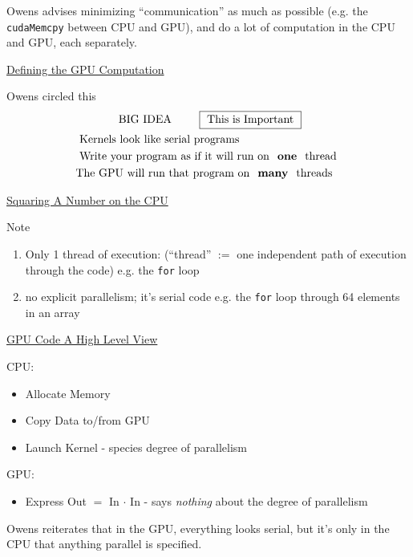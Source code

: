 \documentclass[10pt]{amsart}
\begin{document}
\begin{multicols*}{2}
Owens advises minimizing ``communication'' as much as possible (e.g. the \verb|cudaMemcpy| between CPU and GPU), and do a lot of computation in the CPU and GPU, each separately.

\href{https://classroom.udacity.com/courses/cs344/lessons/55120467/concepts/672300540923}{Defining the GPU Computation}

Owens circled this
{\Large
  \[
  \begin{gathered}
\text{ BIG IDEA } \qquad \, \boxed{ \text{ This is Important } }  \\
\begin{aligned} 
& \text{ Kernels look like serial programs } \\
  & \text{ Write your program as if it will run on \textbf{ one } thread } \\
  & \text{The GPU will run that program on \textbf{ many } threads}
  \end{aligned}
\end{gathered}
\]
}

\href{https://classroom.udacity.com/courses/cs344/lessons/55120467/concepts/670742840923}{Squaring A Number on the CPU}

Note
\begin{enumerate}
\item Only 1 thread of execution: (``thread'' $:=$ one independent path of execution through the code) e.g. the \verb|for| loop
  \item no explicit parallelism; it's serial code e.g. the \verb|for| loop through 64 elements in an array
  \end{enumerate}


\href{https://classroom.udacity.com/courses/cs344/lessons/55120467/concepts/670742870923}{GPU Code A High Level View}

CPU:
\begin{itemize}
  \item Allocate Memory 
  \item Copy Data to/from GPU
    \item Launch Kernel - species degree of parallelism
\end{itemize}

GPU:
\begin{itemize}
\item Express Out $=$ In $\cdot $ In  - says \emph{nothing} about the degree of parallelism
  \end{itemize}

Owens reiterates that in the GPU, everything looks serial, but it's only in the CPU that anything parallel is specified.  


\end{multicols*}
\end{document}

